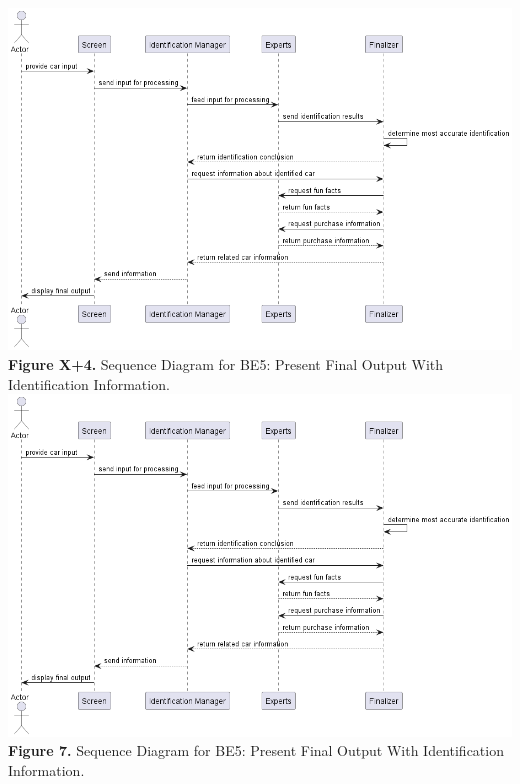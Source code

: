 \documentclass[]{article}
\begin{document}
\begin{center}
	\includegraphics[scale=0.55]{Sequence Diagrams/BE5_Sequence_Diagram.png}\\
	\textbf{Figure X+4.} Sequence Diagram for BE5: Present Final Output With Identification Information.\\
	\includegraphics[scale=0.55]{Sequence Diagrams/BE5_Sequence_Diagram.png}\\
	\textbf{Figure 7.} Sequence Diagram for BE5: Present Final Output With Identification Information.\\


\end{center}
\end{document}
